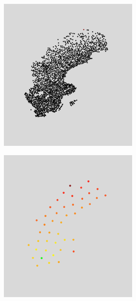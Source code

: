 \begin{figure}[H]
\begin{subfigure}[b]{1\linewidth}
\begin{subfigure}[b]{0.29\linewidth}
		\caption{} 
		\label{fig:bp5_1_sweden} 
		\vspace{4ex}
	\end{subfigure}
	\begin{subfigure}[b]{0.29\linewidth}
		\centering
		\includegraphics[width=0.9\linewidth]{Pictures/bp10_1_sweden}
		\caption{} 
		\label{fig:bp10_1_sweden} 
		\vspace{4ex}
	\end{subfigure}
\end{subfigure}
\begin{subfigure}[b]{1\linewidth}
	\centering
  \begin{subfigure}[b]{0.29\linewidth}
  	\centering
  	\includegraphics[width=0.9\linewidth]{Pictures/ls_10_sweden} 

\end{subfigure}
\end{subfigure}
\end{figure}

